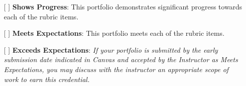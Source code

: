 \documentclass{article}
\begin{document}
\begin{itemize}
\item[[ ]] \textbf{Shows Progress}: This portfolio demonstrates
significant progress towards each of the rubric items.

\item[[ ]] \textbf{Meets Expectations}: This portfolio meets
each of the rubric items.

\item[[ ]] \textbf{Exceeds Expectations}: \textit{If your
portfolio is submitted by the early submission date indicated in Canvas
and accepted by the Instructor as Meets Expectations,
you may discuss with the instructor an appropriate scope of
work to earn this credential.}

\end{itemize}




\end{document}
